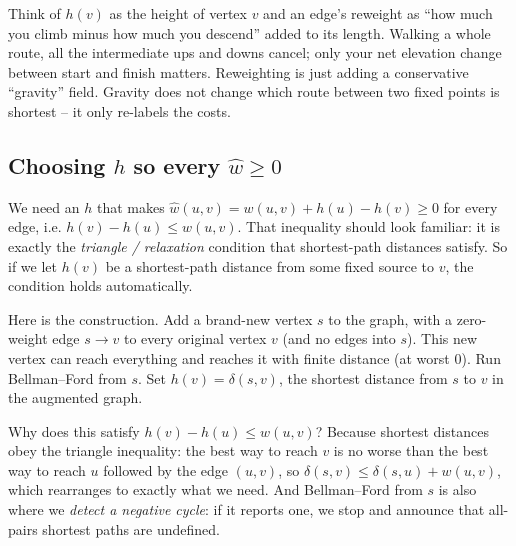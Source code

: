 \begin{intuitionbox}
Think of $h(v)$ as the height of vertex $v$ and an edge's reweight as
``how much you climb minus how much you descend'' added to its length. Walking
a whole route, all the intermediate ups and downs cancel; only your net
elevation change between start and finish matters. Reweighting is just adding a
conservative ``gravity'' field. Gravity does not change which route between two
fixed points is shortest -- it only re-labels the costs.
\end{intuitionbox}

\subsection{Choosing $h$ so every $\hat{w} \ge 0$}

We need an $h$ that makes $\hat{w}(u,v) = w(u,v) + h(u) - h(v) \ge 0$ for every
edge, i.e. $h(v) - h(u) \le w(u,v)$. That inequality should look familiar: it
is exactly the \emph{triangle / relaxation} condition that shortest-path
distances satisfy. So if we let $h(v)$ be a shortest-path distance from some
fixed source to $v$, the condition holds automatically.

Here is the construction. Add a brand-new vertex $s$ to the graph, with a
zero-weight edge $s \to v$ to every original vertex $v$ (and no edges into $s$).
This new vertex can reach everything and reaches it with finite distance (at
worst $0$). Run Bellman--Ford from $s$. Set $h(v) = \delta(s, v)$, the shortest
distance from $s$ to $v$ in the augmented graph.

Why does this satisfy $h(v) - h(u) \le w(u, v)$? Because shortest distances
obey the triangle inequality: the best way to reach $v$ is no worse than the
best way to reach $u$ followed by the edge $(u,v)$, so
$\delta(s,v) \le \delta(s,u) + w(u,v)$, which rearranges to exactly what we
need. And Bellman--Ford from $s$ is also where we \emph{detect a negative
cycle}: if it reports one, we stop and announce that all-pairs shortest paths
are undefined.

